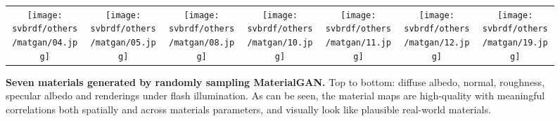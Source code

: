 \begin{figure}[!ht]
	\centering
	\setlength{\resLen}{0.85in}
	\addtolength{\tabcolsep}{-4pt}
	\begin{tabular}{ccccccc}
		\texttt{[image: svbrdf/others/matgan/04.jpg]} &
		\texttt{[image: svbrdf/others/matgan/05.jpg]} &
		\texttt{[image: svbrdf/others/matgan/08.jpg]} &
		\texttt{[image: svbrdf/others/matgan/10.jpg]} &
		\texttt{[image: svbrdf/others/matgan/11.jpg]} &
		\texttt{[image: svbrdf/others/matgan/12.jpg]} &
		\texttt{[image: svbrdf/others/matgan/19.jpg]}
	\end{tabular}
	\caption[Materials generated by MaterialGAN]{\label{fig:svbrdf:matgan}
		\textbf{Seven materials generated by randomly sampling MaterialGAN.} Top to bottom: diffuse albedo, normal, roughness, specular albedo and renderings under flash illumination. As can be seen, the material maps are high-quality with meaningful correlations both spatially and across materials parameters, and visually look like plausible real-world materials.
	}
\end{figure}